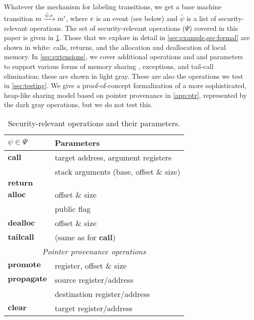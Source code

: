 \documentclass[10pt,conference]{ieeetran}%
\theoremstyle{definition}
\begin{document}
Whatever the mechanism for labeling transitions, we get a base
machine transition \(m \xrightarrow{\bar{\psi}, e} m'\), where \(e\) is
an event (see below) and \(\bar{\psi}\) is a list of security-relevant operations.
The set of security-relevant operations (\(\Psi\)) covered in this paper is given in
\cref{tab:psi}. Those that we explore in detail in \cref{sec:example,sec:formal}
are shown in white: calls, returns, and the allocation and deallocation of local memory.
In \cref{sec:extensions}, we cover additional operations and and parameters 
to support various forms of memory sharing \ifexceptions , exceptions, \fi
and tail-call elimination; these are shown in light gray. These are also
the operations we test in \cref{sec:testing}.
We give a proof-of-concept formalization of a more sophisticated, heap-like sharing model
based on pointer provenance in \cref{app:ptr}, represented by the dark gray
operations, but we do not test this.

\newcommand{\example}{\rowcolor{black!0}}
\newcommand{\testing}{\rowcolor{black!10}}
\newcommand{\theory}{\rowcolor{black!25}}

\begin{table}
\begin{center}
  \begin{tabular}{| l | l |}
    \hline
    \(\psi \in \Psi\) & Parameters \\
    \hline
    \example \(\mathbf{call}\) & target address, argument registers \\
    \testing & stack arguments (base, offset \& size) \\
    \example \(\mathbf{return}\) & \\
    \example \(\mathbf{alloc}\) & offset \& size \\
    \testing & public flag \\
    \example \(\mathbf{dealloc}\) & offset \& size \\
    \testing \(\mathbf{tail call}\) & (same as for \(\mathbf{call}\)) \\
    \hline
    \multicolumn{2}{|c|}{{\it Pointer provenance operations}} \\
    \hline
    \theory \(\mathbf{promote}\) & register, offset \& size \\
    \theory \(\mathbf{propagate}\) & source register/address \\
    \theory & destination register/address \\
    \theory \(\mathbf{clear}\) & target register/address \\
    \hline
  \end{tabular}
\end{center}
\caption{Security-relevant operations and their parameters.}
  \label{tab:psi}
\end{table}
\end{document}

